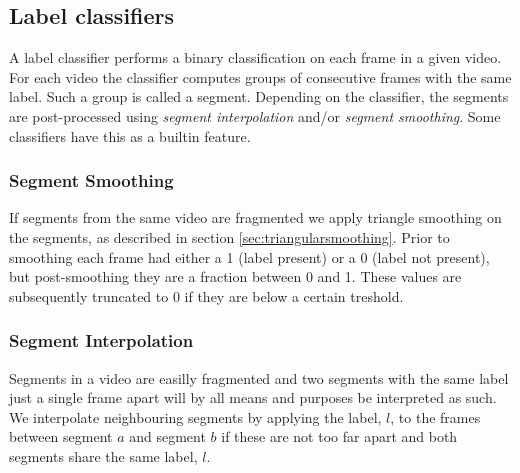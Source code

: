 \subsection{Label classifiers}
%
A label classifier performs a binary classification on each frame in a given video. For each video the classifier computes groups of consecutive frames with the same label. Such a group is called a segment. Depending on the classifier, the segments are post-processed using \textit{segment interpolation} and/or \textit{segment smoothing}. Some classifiers have this as a builtin feature.
%
\subsubsection{Segment Smoothing}\label{sec:labelsmooth}
%
If segments from the same video are fragmented we apply triangle smoothing on the segments, as described in section \ref{sec:triangularsmoothing}. Prior to smoothing each frame had either a 1 (label present) or a 0 (label not present), but post-smoothing they are a fraction between 0 and 1. These values are subsequently truncated to 0 if they are below a certain treshold.
%
\subsubsection{Segment Interpolation}\label{sec:labelmerge}
%
Segments in a video are easilly fragmented and two segments with the same label just a single frame apart will by all means and purposes be interpreted as such. We interpolate neighbouring segments by applying the label, $l$, to the frames between segment $a$ and segment $b$ if these are not too far apart and both segments share the same label, $l$.
%
